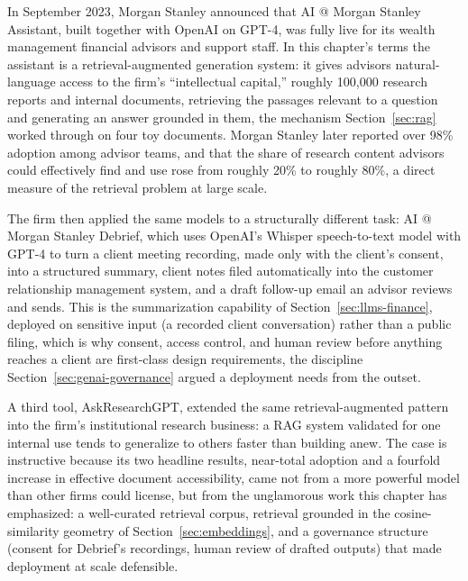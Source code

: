 \documentclass[../ai_in_finance]{subfiles}
\begin{document}

In September 2023, Morgan Stanley announced that AI @ Morgan Stanley Assistant, built together with OpenAI on GPT-4, was fully live for its wealth management financial advisors and support staff. In this chapter's terms the assistant is a retrieval-augmented generation system: it gives advisors natural-language access to the firm's ``intellectual capital,'' roughly 100,000 research reports and internal documents, retrieving the passages relevant to a question and generating an answer grounded in them, the mechanism Section~\ref{sec:rag} worked through on four toy documents. Morgan Stanley later reported over 98\% adoption among advisor teams, and that the share of research content advisors could effectively find and use rose from roughly 20\% to roughly 80\%, a direct measure of the retrieval problem at large scale.

The firm then applied the same models to a structurally different task: AI @ Morgan Stanley Debrief, which uses OpenAI's Whisper speech-to-text model with GPT-4 to turn a client meeting recording, made only with the client's consent, into a structured summary, client notes filed automatically into the customer relationship management system, and a draft follow-up email an advisor reviews and sends. This is the summarization capability of Section~\ref{sec:llms-finance}, deployed on sensitive input (a recorded client conversation) rather than a public filing, which is why consent, access control, and human review before anything reaches a client are first-class design requirements, the discipline Section~\ref{sec:genai-governance} argued a deployment needs from the outset.

A third tool, AskResearchGPT, extended the same retrieval-augmented pattern into the firm's institutional research business: a RAG system validated for one internal use tends to generalize to others faster than building anew. The case is instructive because its two headline results, near-total adoption and a fourfold increase in effective document accessibility, came not from a more powerful model than other firms could license, but from the unglamorous work this chapter has emphasized: a well-curated retrieval corpus, retrieval grounded in the cosine-similarity geometry of Section~\ref{sec:embeddings}, and a governance structure (consent for Debrief's recordings, human review of drafted outputs) that made deployment at scale defensible.
\end{document}
